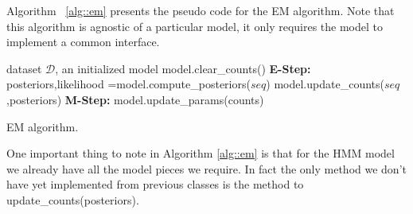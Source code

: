 Algorithm ~\ref{alg::em} presents the pseudo code for the EM
algorithm. Note that this algorithm is agnostic of a particular model,
it only requires the model to implement a common interface.

\begin{algorithm}
\begin{algorithmic}[1]
   dataset $\mathcal{D}$, an initialized model
      \STATE model.clear\_counts()
        \STATE \textbf{E-Step:}
        \STATE posteriors,likelihood =model.compute\_posteriors($seq$)
        \STATE model.update\_counts($seq$,posteriors)
      \ENDFOR
      \STATE \textbf{M-Step:}
         \STATE model.update\_params(counts)
    \ENDFOR
\end{algorithmic}    
\caption[EM algorithm]{\label{alg::em}  EM algorithm.} 
\end{algorithm}


One important thing to note in Algorithm \ref{alg::em} is that for the
HMM model we already have all the model pieces we require. In fact
the only method we don't have yet implemented from previous classes is
the method to update\_counts(posteriors). 

